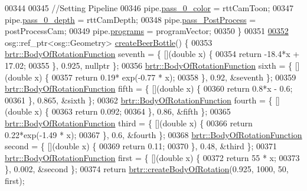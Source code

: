 \begin{DoxyCode}
00344 
00345         \textcolor{comment}{//Setting Pipeline}
00346         pipe.\hyperlink{structbrtr_1_1_rendering_pipeline_ae945030321a6b44f00266954c8c50bf3}{pass\_0\_color} = rttCamToon;
00347         pipe.\hyperlink{structbrtr_1_1_rendering_pipeline_a18752632c1b557d283e523ebbc0443a0}{pass\_0\_depth} = rttCamDepth;
00348         pipe.\hyperlink{structbrtr_1_1_rendering_pipeline_aea2228e41f1e5c6db5d616c05ecc27fd}{pass\_PostProcess} = postProcessCam;
00349         pipe.\hyperlink{structbrtr_1_1_rendering_pipeline_afe773fb98986d39ef23a4edf3634af10}{programs} = programVector;
00350     \}
00351 
\hypertarget{_util_functions_8cpp_source_l00352}{}\hyperlink{namespacebrtr_a16fa8982307a039c08ab56912bab94b9}{00352}     osg::ref\_ptr<osg::Geometry> \hyperlink{namespacebrtr_a16fa8982307a039c08ab56912bab94b9}{createBeerBottle}() \{
00353         \hyperlink{structbrtr_1_1_body_of_rotation_function}{brtr::BodyOfRotationFunction} seventh = \{ [](\textcolor{keywordtype}{double} x) \{
00354             \textcolor{keywordflow}{return} -18.4*x + 17.02;
00355         \}, 0.925, \textcolor{keyword}{nullptr} \};
00356         \hyperlink{structbrtr_1_1_body_of_rotation_function}{brtr::BodyOfRotationFunction} sixth = \{ [](\textcolor{keywordtype}{double} x) \{
00357             \textcolor{keywordflow}{return} 0.19* exp(-0.77 * x);
00358         \}, 0.92, &seventh \};
00359         \hyperlink{structbrtr_1_1_body_of_rotation_function}{brtr::BodyOfRotationFunction} fifth = \{ [](\textcolor{keywordtype}{double} x) \{
00360             \textcolor{keywordflow}{return} 0.8*x - 0.6;
00361         \}, 0.865, &sixth \};
00362         \hyperlink{structbrtr_1_1_body_of_rotation_function}{brtr::BodyOfRotationFunction} fourth = \{ [](\textcolor{keywordtype}{double} x) \{
00363             \textcolor{keywordflow}{return} 0.092;
00364         \}, 0.86, &fifth \};
00365         \hyperlink{structbrtr_1_1_body_of_rotation_function}{brtr::BodyOfRotationFunction} third = \{ [](\textcolor{keywordtype}{double} x) \{
00366             \textcolor{keywordflow}{return} 0.22*exp(-1.49 * x);
00367         \}, 0.6, &fourth \};
00368         \hyperlink{structbrtr_1_1_body_of_rotation_function}{brtr::BodyOfRotationFunction} second = \{ [](\textcolor{keywordtype}{double} x) \{
00369             \textcolor{keywordflow}{return} 0.11;
00370         \}, 0.48, &third \};
00371         \hyperlink{structbrtr_1_1_body_of_rotation_function}{brtr::BodyOfRotationFunction} first = \{ [](\textcolor{keywordtype}{double} x) \{
00372             \textcolor{keywordflow}{return} 55 * x;
00373         \}, 0.002, &second \};
00374         \textcolor{keywordflow}{return} \hyperlink{namespacebrtr_a83d3e627c9dc247459610aa9fec23d7b}{brtr::createBodyOfRotation}(0.925, 1000, 50, first);

\end{DoxyCode}
